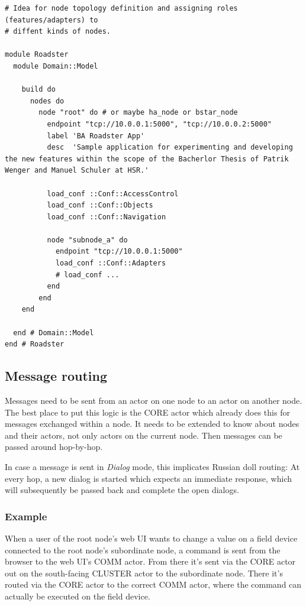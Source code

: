 \begin{lstlisting}[style=customruby, caption={Cluster DSL example with HA and roles}, label={lst:dsl:topo:with-roles}]
# Idea for node topology definition and assigning roles (features/adapters) to
# diffent kinds of nodes.

module Roadster
  module Domain::Model

    build do
      nodes do
        node "root" do # or maybe ha_node or bstar_node
          endpoint "tcp://10.0.0.1:5000", "tcp://10.0.0.2:5000"
          label 'BA Roadster App'
          desc  'Sample application for experimenting and developing the new features within the scope of the Bacherlor Thesis of Patrik Wenger and Manuel Schuler at HSR.'

          load_conf ::Conf::AccessControl
          load_conf ::Conf::Objects
          load_conf ::Conf::Navigation

          node "subnode_a" do
            endpoint "tcp://10.0.0.1:5000"
            load_conf ::Conf::Adapters
            # load_conf ...
          end
        end
    end

  end # Domain::Model
end # Roadster
\end{lstlisting}


\subsection{Message routing}
Messages need to be sent from an actor on one node to an actor on another node. The best place to put this logic is the CORE actor which already does this for messages exchanged within a node. It needs to be extended to know about nodes and their actors, not only actors on the current node. Then messages can be passed around hop-by-hop.

In case a message is sent in \emph{Dialog} mode, this implicates Russian doll routing: At every hop, a new dialog is started which expects an immediate response, which will subsequently be passed back and complete the open dialogs.

\subsubsection{Example}
When a user of the root node's web UI wants to change a value on a field device
connected to the root node's subordinate node, a command is sent from the
browser to the web UI's COMM actor. From there it's sent via the CORE actor out
on the south-facing CLUSTER actor to the subordinate node. There it's routed
via the CORE actor to the correct COMM actor, where the command can actually be
executed on the field device.


